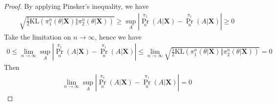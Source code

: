 \begin{proof}
By applying Pinsker's inequality, we have
\begin{align*}
    \sqrt{\frac{1}{2}\mathrm{KL}\left( \pi_1^{n}(\theta \vert \bm{X}) \Vert \pi_2^{n}(\theta \vert \bm{X})\right)} \geq \sup_A \left\vert \Pr^{\pi_1}_n(A \vert \bm{X}) - \Pr^{\pi_1}_n(A \vert \bm{X}) \right\vert
    \geq 0
\end{align*}
Take the limitation on $n \rightarrow \infty$,  hence we have
\begin{align*}
    0 \leq
    \lim_{n\rightarrow\infty} \sup_A \left\vert \Pr^{\pi_1}_n(A \vert \bm{X}) - \Pr^{\pi_1}_n(A \vert \bm{X}) \right\vert
    \leq
    \lim_{n\rightarrow\infty} \sqrt{\frac{1}{2}\mathrm{KL}\left( \pi_1^{n}(\theta \vert \bm{X}) \Vert \pi_2^{n}(\theta \vert \bm{X})\right)} = 0
\end{align*}
Then
\begin{align*}
    \lim_{n\rightarrow\infty} \sup_A \left\vert \Pr^{\pi_1}_n(A \vert \bm{X}) - \Pr^{\pi_1}_n(A \vert \bm{X}) \right\vert
    = 0
\end{align*}
\end{proof}